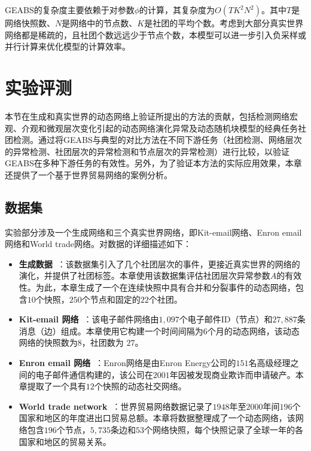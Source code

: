 GEABS的复杂度主要依赖于对参数$\phi$的计算，其复杂度为$O(TK^2N^2)$。其中$T$是网络快照数、$N$是网络中的节点数、$K$是社团的平均个数。考虑到大部分真实世界网络都是稀疏的，且社团个数远远少于节点个数，本模型可以进一步引入负采样或并行计算来优化模型的计算效率。

\section{实验评测\label{chap4:experiment}}

本节在生成和真实世界的动态网络上验证所提出的方法的贡献，包括检测网络宏观、介观和微观层次变化引起的动态网络演化异常及动态随机块模型的经典任务社团检测。通过将GEABS与典型的对比方法在不同下游任务（社团检测、网络层次的异常检测、社团层次的异常检测和节点层次的异常检测）进行比较，以验证GEABS在多种下游任务的有效性。另外，为了验证本方法的实际应用效果，本章还提供了一个基于世界贸易网络的案例分析。

\subsection{数据集}

实验部分涉及一个生成网络和三个真实世界网络，即Kit-email网络、Enron email网络和World trade网络。对数据的详细描述如下：

\begin{itemize}

\item \textbf{生成数据~\cite{greene2010tracking}}：该数据集引入了几个社团层次的事件，更接近真实世界的网络的演化，并提供了社团标签。本章使用该数据集评估社团层次异常参数$A$的有效性。为此，本章生成了一个在连续快照中具有合并和分裂事件的动态网络，包含$10$个快照，$250$个节点和固定的$22$个社团。

\item \textbf{Kit-email 网络~\cite{gorkedynamic}}：该电子邮件网络由$1,097$个电子邮件ID（节点）和$27,887$条消息（边）组成。本章使用它构建一个时间间隔为$6$个月的动态网络，该动态网络的快照数为$8$，社团数为 $27$。

\item \textbf{Enron email 网络~\cite{benston2002enron}}：Enron网络是由Enron Energy公司的$151$名高级经理之间的电子邮件通信构建的，该公司在$2001$年因被发现商业欺诈而申请破产。本章提取了一个具有$12$个快照的动态社交网络。

\item \textbf{World trade network~\cite{worldset2002}}：世界贸易网络数据记录了$1948$年至$2000$年间$196$个国家和地区的年度进出口贸易总额。本章将数据整理成了一个动态网络，该网络包含$196$个节点，$5,735$条边和$53$个网络快照，每个快照记录了全球一年的各国家和地区的贸易关系。
\end{itemize}




